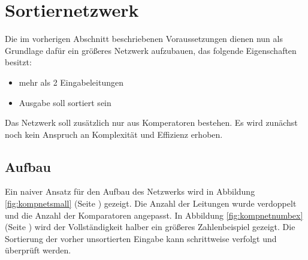 \documentclass[11pt,ngerman]{article}
\begin{document}
\section{Sortiernetzwerk}
Die im vorherigen Abschnitt beschriebenen Voraussetzungen dienen nun als Grundlage dafür ein größeres Netzwerk aufzubauen, das folgende Eigenschaften besitzt:
\begin{itemize}
\item mehr als 2 Eingabeleitungen
\item Ausgabe soll sortiert sein
\end{itemize}
Das Netzwerk soll zusätzlich nur aus Komperatoren bestehen. Es wird zunächst noch kein Anspruch an Komplexität und Effizienz erhoben.
\subsection{Aufbau}
Ein naiver Ansatz für den Aufbau des Netzwerks wird in Abbildung \ref{fig:kompnetsmall} (Seite \pageref{fig:kompnetsmall}) gezeigt. Die Anzahl der Leitungen wurde verdoppelt und die Anzahl der Komparatoren angepasst. In Abbildung \ref{fig:kompnetnumbex} (Seite \pageref{fig:kompnetnumbex}) wird der Vollständigkeit halber ein größeres Zahlenbeispiel gezeigt. Die Sortierung der vorher unsortierten Eingabe kann schrittweise verfolgt und überprüft werden.
\end{document}
